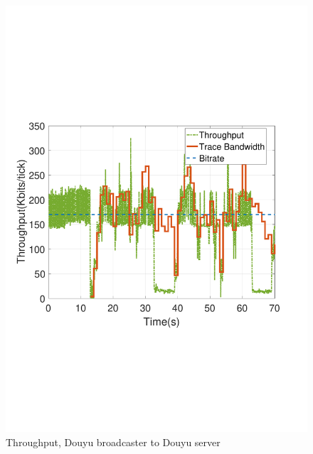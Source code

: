 \begin{figure}[htb]
  \includegraphics[width=\linewidth]{fig/douyu.pdf}
  \caption{Throughput, Douyu broadcaster to Douyu server}
  \label{fig:douyu}
\endminipage\hfill
{}%

\end{figure}
